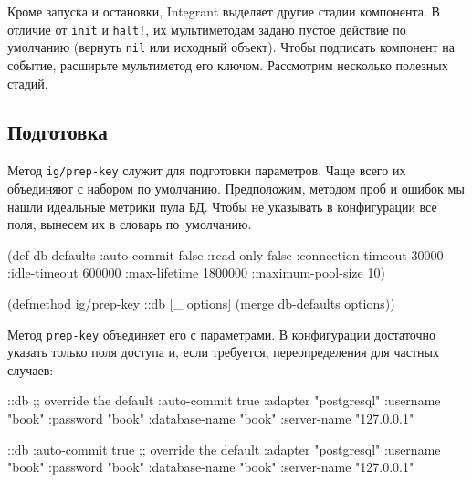 
Кроме запуска и остановки, Integrant выделяет другие стадии компонента. В
отличие от \verb|init| и \verb|halt!|, их мультиметодам задано пустое действие
по умолчанию (вернуть \verb|nil| или исходный объект). Чтобы подписать компонент
на событие, расширьте мультиметод его ключом. Рассмотрим несколько полезных
стадий.

\subsection{Подготовка}

Метод \verb|ig/prep-key| служит для подготовки параметров. Чаще всего их
объединяют с набором по умолчанию. Предположим, методом проб и ошибок мы нашли
идеальные метрики пула БД. Чтобы не указывать в конфигурации все поля, вынесем
их в словарь по~умолчанию.

\begin{english}
  \begin{clojure}
(def db-defaults
  {:auto-commit        false
   :read-only          false
   :connection-timeout 30000
   :idle-timeout       600000
   :max-lifetime       1800000
   :maximum-pool-size  10})

(defmethod ig/prep-key ::db
  [_ options]
  (merge db-defaults options))
  \end{clojure}
\end{english}

Метод \verb|prep-key| объединяет его с параметрами. В конфигурации достаточно
указать только поля доступа и, если требуется, переопределения для частных
случаев:

\ifnarrow

\begin{english}
  \begin{clojure}
{::db {;; override the default
       :auto-commit   true
       :adapter       "postgresql"
       :username      "book"
       :password      "book"
       :database-name "book"
       :server-name   "127.0.0.1"}}
  \end{clojure}
\end{english}

\else

\begin{english}
  \begin{clojure}
{::db {:auto-commit   true ;; override the default
       :adapter       "postgresql"
       :username      "book"
       :password      "book"
       :database-name "book"
       :server-name   "127.0.0.1"}}
  \end{clojure}
\end{english}

